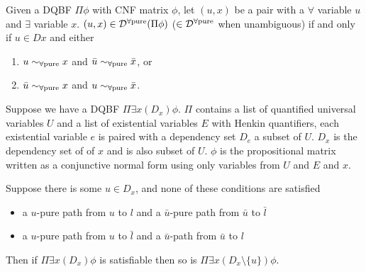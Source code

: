 \documentclass[runningheads]{llncs}
\newcommand{\pusim}{\ensuremath{\sim_{\mbox{\scriptsize \upshape $\forall$pure}}}}
\newcommand{\Dz}[1]{\ensuremath{\mathcal{D}^{\mbox{\scriptsize \upshape #1}}}\xspace}
\newcommand{\Dpu}{\Dz{$\forall$pure}}
\begin{document}
	
	\begin{definition}
		\label{def:upure-non-dependency}
		Given a DQBF $\Pi\phi$ with CNF matrix $\phi$, let $(u,x)$ be a pair with a $\forall$ variable $u$ and $\exists$ variable $x$. 
		$(u,x)\in \Dpu(\Pi \phi)$ ($\in\Dpu$ when unambiguous) if and only if $u\in D{x}$ and either		
		\begin{enumerate}
			\item $u \pusim x$ and $\bar u \pusim \bar x$, or
			\item $\bar u \pusim x$ and $u \pusim \bar x$.
		\end{enumerate}

		\end{definition}
		\begin{lemma}
		Suppose we have a DQBF $\Pi\exists x(D_x) \phi$.
		$\Pi$ contains a list of quantified universal variables $U$ and a list of existential variables $E$ with Henkin quantifiers, each existential variable $e$ is paired with a dependency set $D_e$ a subset of $U$. $D_x$ is the dependency set of of $x$ and is also  subset of $U$.
		$\phi$ is the propositional matrix written as a conjunctive normal form using only variables from $U$ and $E$ and $x$.
		
		Suppose there is some $u \in D_x$, and none of these conditions are satisfied
		\begin{itemize}
			\item a $u$-pure path from $u$ to $l$ and a $\bar u $-pure path from $\bar u $ to $\bar l$
			\item a  $u$-pure path from $u$ to $\bar l$ and a $\bar u $-path from $\bar u $ to $l$
		\end{itemize}
		Then if $\Pi\exists x(D_x) \phi$ is satisfiable then so is $\Pi\exists x(D_x\setminus\{u\}) \phi$.
		
	\end{lemma}
	
\end{document}
